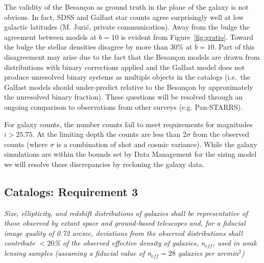 \documentclass[]{article}
\begin{document}
The validity of the Besan\c{c}on as ground truth in the plane of the
galaxy is not obvious.  In fact, SDSS and Galfast star counts agree
surprisingly well at low galactic latitudes (M. Juri\'{c}, private
communication). Away from the bulge the agreement between models at
$b=10$ is evident from Figure~\ref{fig:gratio}. Toward the bulge the
stellar densities disagree by more than 30\% at $b=10$. Part of this
disagreement may arise due to the fact that the Besan\c{c}on models
are drawn from distributions with binary corrections applied and the
Galfast model does not produce unresolved binary systems as multiple
objects in the catalogs (i.e.\ the Galfast models should under-predict
relative to the Besan\c{c}on by approximately the unresolved binary
fraction).  These questions will be resolved through an ongoing
comparison to observations from other surveys (e.g. Pan-STARRS).

For galaxy counts, the  number counts fail to meet
requirements for magnitudes $i>25.75$. At the limiting depth the
counts are less than 2$\sigma$ from the observed counts (where
$\sigma$ is a combination of shot and cosmic variance). While the
galaxy simulations are within the bounds set by Data Management for
the sizing model we will resolve these discrepancies by recloning the
galaxy data.

\subsection{Catalogs:  Requirement 3}

{\it Size, ellipticity, and redshift distributions of galaxies shall
  be representative of those observed by extant space and ground-based
  telescopes and, for a fiducial image quality of 0.72 arcsec,
  deviations from the observed distributions shall contribute $<20$\%
  of the observed effective density of galaxies, n$_{eff}$, used in
  weak lensing samples (assuming a fiducial value of n$_{eff} =
  28$ galaxies per arcmin$^2$)}\\
\end{document}
